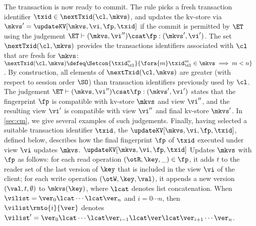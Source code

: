 The transaction is now ready to commit. The rule picks a fresh transaction identifier $\txid \in \nextTxid(\cl, \mkvs)$, 
and updates the kv-store via $\mkvs' = \updateKV[\mkvs, \vi, \fp, \txid]$
if the commit is permitted by $\ET$ using the judgement $\ET \vdash (\mkvs, \vi'') \csat \fp : (\mkvs', \vi')$.
The set $\nextTxid(\cl, \mkvs)$ provides the transactions identifiers
associated with $\cl$ that are fresh for  $\mkvs$:
$
\nextTxid(\cl, \mkvs) \defeq \Setcon{\txid_{\cl}^{n}}{\fora{m}
  \txid_{\cl}^{m} \in \mkvs \implies m < n }
$.
By construction, all elements of $\nextTxid(\cl, \mkvs)$ are greater (with respect to session order $\SO$) 
than transaction identifiers previously used by $\cl$. 
The judgement $\ET \vdash (\mkvs, \vi'') \csat \fp : (\mkvs', \vi')$
states that the fingerprint $\fp$ is compatible with kv-store $\mkvs$
and view $\vi''$, and the resulting view $\vi'$ 
is compatible with view \( \vi'' \) and final kv-store \( \mkvs' \).
In \cref{sec:cm}, we give several examples of such judgements.
Finally, having selected a suitable transaction identifier $\txid$,
the $\updateKV[\mkvs, \vi, \fp, \txid]$, defined below, describes how the final fingerprint $\fp$ of $\txid$ executed 
under view $\vi$ updates $\mkvs$.
$\updateKV[\mkvs, \vi, \fp, \txid]$ Updates $\mkvs$ with $\fp$ as follows: 
for each read operation $(\otR, \key, \_) \in \fp$, it adds $t$ 
to the reader set of the last version of $\key$ that is included in the view $\vi$ of the client; 
for each write operation $(\otW, \key, \val)$, it appends a new version $(\val, t, \emptyset)$ 
to $\mkvs(\key)$, where $\lcat$ denotes list concatenation.
When $\vilist = \ver_0 \lcat \cdots \lcat \ver_n$ and $i=0 \cdots n$, 
then $\vilist\rmto{i}{\ver}$ denotes 
$\vilist' = \ver_0 \lcat \cdots \lcat \ver_{i-1} \lcat \ver \lcat \ver_{i+1} \cdots \ver_{n}$. 


